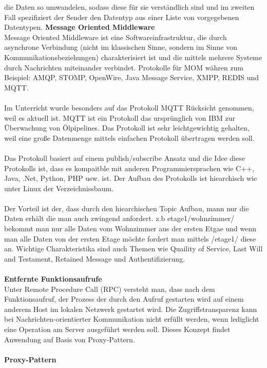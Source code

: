 \documentclass[a4paper,12pt]{article}
\begin{document}
die Daten so umwandelen, sodass diese für sie verständlich sind und im zweiten Fall spezifiziert der Sender den Datentyp aus einer Liste von vorgegebenen Datentypen.
\cite{communication1}
\newpage
\noindent
\textbf{Message Oriented Middleware\\}
Message Oriented Middleware ist eine Softwareinfrastruktur, die durch asynchrone Verbindung (nicht im klassischen Sinne, sondern im Sinne von Kommunikationsbeziehungen) charakterisiert ist und die mittels mehrere Systeme durch Nachrichten miteinander verbindet. Protokolle für MOM währen zum Beispiel: 
AMQP, STOMP, OpenWire, Java Message Service, XMPP, REDIS und MQTT.\\\\Im Unterricht wurde besonders auf das Protokoll MQTT Rücksicht genommen, weil es aktuell ist. MQTT ist ein Protokoll das ursprünglich von IBM zur Überwachung von Ölpipelines. Das Protokoll ist sehr leichtgewichtig gehalten, weil eine große Datenmenge
mittels einfachen Protokoll übertragen werden soll. \\\\
Das Protokoll basiert auf einem publish/subscribe Ansatz und die Idee diese Protokolls ist, dass es kompaitble mit anderen Programmiersprachen wie C++, Java, .Net, Python, PHP usw. ist. Der Aufbau des Protokolls ist hiearchisch wie unter Linux der Verzeichnissbaum. \\\\Der Vorteil ist der, dass durch den hiearchischen Topic Aufbau, mann nur die 
Daten erhält die man auch zwingend anfordert. z.b etage1/wohnzimmer/ bekommt man nur alle Daten vom Wohnzimmer aus der ersten Etgae und wenn man alle Daten von der ersten Etage möchte fordert man mittels /etage1/ diese an. Wichtige Charakteristika sind auch Themen wie Quaility of Service, Last Will and Testament, Retained Message und Authentifizierung.\\
\\
\textbf{Entfernte Funktionsaufrufe}\\
Unter Remote Procedure Call (RPC) versteht man, dass nach dem Funktionsaufruf, der Prozess der durch den Aufruf gestarten wird auf einem anderem Host im lokalen Netzwerk gestartet wird. Die Zugriffstransparenz kann bei Nachrichten-orientierter Kommunikation nicht erfüllt werden, wenn lediglicht eine Operation am Server ausgeführt werden soll. Dieses Konzept findet Anwendung auf Basis von Proxy-Pattern.\\\\
\newpage
\noindent
\textbf{Proxy-Pattern}\\
\end{document}
